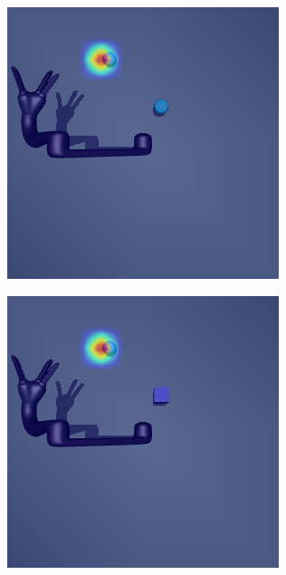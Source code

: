 \begin{figure}
\begin{subfigure}{0.24\columnwidth}
  \end{subfigure}
  \begin{subfigure}{0.24\columnwidth}
    \includegraphics[width=\linewidth]{figures/chapter6/distractor_saliency_jaco_pro_on/color_sensor_random}
  \end{subfigure}
  \begin{subfigure}{0.24\columnwidth}
    \includegraphics[width=\linewidth]{figures/chapter6/distractor_saliency_jaco_pro_on/shape_sensor_random}

\end{subfigure}
\end{figure}
